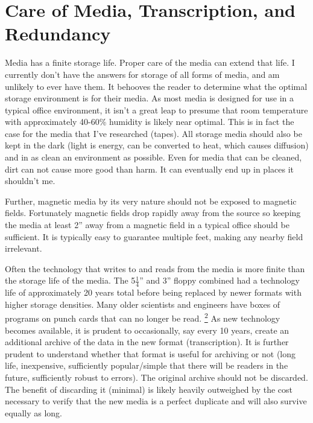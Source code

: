 \documentclass[a4paper]{article}
\providecommand*{\DUfootnotemark}[3]{%
  \raisebox{1em}{\hypertarget{#1}{}}%
  \hyperlink{#2}{\textsuperscript{#3}}%
}
\begin{document}
\section{Care of Media, Transcription, and Redundancy%
  \label{care-of-media-transcription-and-redundancy}%
}

Media has a finite storage life. Proper care of the media can extend
that life. I currently don't have the answers for storage of all forms
of media, and am unlikely to ever have them. It behooves the reader to
determine what the optimal storage environment is for their media. As
most media is designed for use in a typical office environment, it isn’t
a great leap to presume that room temperature with approximately 40-60\%
humidity is likely near optimal. This is in fact the case for the media
that I’ve researched (tapes). All storage media should also be kept in
the dark (light is energy, can be converted to heat, which causes
diffusion) and in as clean an environment as possible. Even for media
that can be cleaned, dirt can not cause more good than harm. It can
eventually end up in places it shouldn’t me.

Further, magnetic media by its very nature should not be exposed to
magnetic fields. Fortunately magnetic fields drop rapidly away from the
source so keeping the media at least 2” away from a magnetic field in a
typical office should be sufficient. It is typically easy to guarantee
multiple feet, making any nearby field irrelevant.

Often the technology that writes to and reads from the media is more
finite than the storage life of the media. The 5$\frac{1}{4}$”
and 3” floppy combined had a technology life of approximately 20 years
total before being replaced by newer formats with higher storage
densities. Many older scientists and engineers have boxes of programs on
punch cards that can no longer be read.\DUfootnotemark{id4}{id7}{2} As new technology becomes
available, it is prudent to occasionally, say every 10 years, create an
additional archive of the data in the new format (transcription). It is
further prudent to understand whether that format is useful for archiving or not
(long life, inexpensive, sufficiently popular/simple that there will be readers
in the future, sufficiently robust to errors). The original archive
should not be discarded. The benefit of discarding it (minimal) is
likely heavily outweighed by the cost necessary to verify that the new
media is a perfect duplicate and will also survive equally as long.
\end{document}
